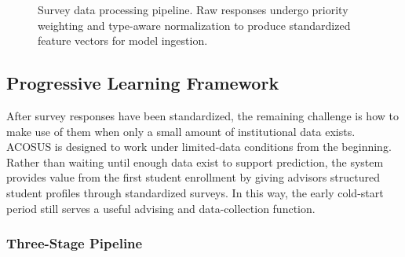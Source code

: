 \documentclass[letterpaper,11pt]{article}
\begin{document}
\begin{figure}[htbp]
{
}
\caption{Survey data processing pipeline. Raw responses undergo priority weighting and type-aware normalization to produce standardized feature vectors for model ingestion.}
\label{fig:processing}
\end{figure}

\subsection{Progressive Learning Framework}\label{subsec:progressive}

After survey responses have been standardized, the remaining challenge is how to make use of them when only a small amount of institutional data exists. ACOSUS is designed to work under limited-data conditions from the beginning. Rather than waiting until enough data exist to support prediction, the system provides value from the first student enrollment by giving advisors structured student profiles through standardized surveys. In this way, the early cold-start period still serves a useful advising and data-collection function.

\subsubsection{Three-Stage Pipeline}
\end{document}
